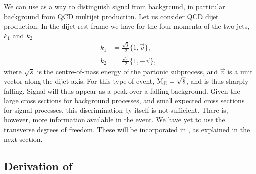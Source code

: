 We can use \mr as a way to distinguish signal from background, in particular background from QCD
multijet production. Let us consider QCD dijet production. In the dijet rest frame we have for the
four-momenta of the two jets, $k_1$ and $k_2$
\begin{align}
  k_1 &= \frac{\sqrt{\hat{s}}}{2} \{1, \vec{v}\} ,\\
  k_2 &= \frac{\sqrt{\hat{s}}}{2} \{1, -\vec{v}\},
\end{align}
where $\sqrt{\hat{s}}$ is the centre-of-mass energy of the partonic subprocess, and $\vec{v}$ is a
unit vector along the dijet axis. For this type of event, $\mathrm{M_R} = \sqrt{\hat{s}}$, and is thus
sharply falling. Signal will thus appear as a peak over a falling background. Given the large cross
sections for background processes, and small expected cross sections for signal processes, this
discrimination by itself is not sufficient. There is, however, more information available in the
event. We have yet to use the transverse degrees of freedom. These will be incorporated in \rsq, as
explained in the next section. 

\subsection{Derivation of \texorpdfstring{\rsq}{R2} \label{sec:razor_r2}}

